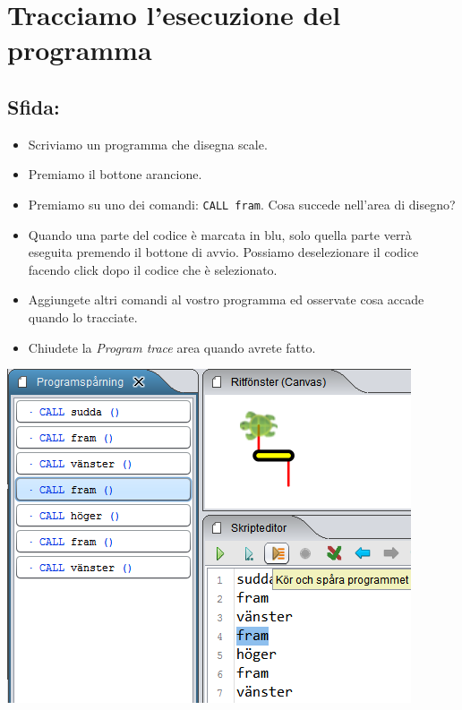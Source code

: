 \chapter{Tracciamo l'esecuzione del programma}
\begin{multicols}{2}
\section*{\color{BrickRed}Sfida:}


\begin{itemize}

\item {Scriviamo un programma che disegna scale.}
\item {Premiamo il bottone arancione.}
\item {Premiamo su uno dei comandi: \lstinline{CALL fram}. Cosa succede nell'area di disegno?}
\item {Quando una parte del codice è marcata in blu, solo quella parte verrà eseguita premendo il bottone di avvio. Possiamo deselezionare il codice facendo click dopo il codice che è selezionato. }
\item {Aggiungete altri comandi al vostro programma ed osservate cosa accade quando lo tracciate.}
\item {Chiudete la {\it Program trace} area quando avrete fatto.}

\end{itemize}



\columnbreak

\begin{center}
\includegraphics{../img/trace.png}
\end{center}

\end{multicols}

